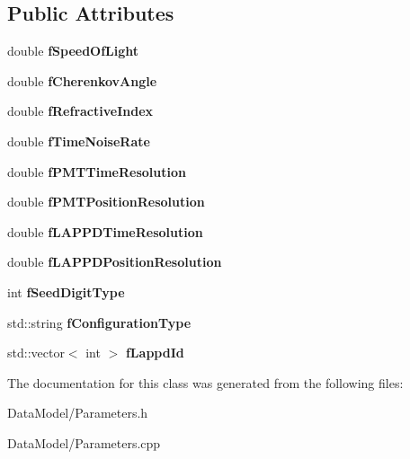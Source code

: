 \subsection*{Public Attributes}
\begin{DoxyCompactItemize}
\item 
\hypertarget{classParameters_a0ab2806085b853d149fd6e4c8e569cca}{double {\bfseries f\-Speed\-Of\-Light}}\label{classParameters_a0ab2806085b853d149fd6e4c8e569cca}

\item 
\hypertarget{classParameters_ab8ef3df2fb41ab745ff7647dbc8cc50b}{double {\bfseries f\-Cherenkov\-Angle}}\label{classParameters_ab8ef3df2fb41ab745ff7647dbc8cc50b}

\item 
\hypertarget{classParameters_a71d8363c51b45b3eea2845316a8a4f5d}{double {\bfseries f\-Refractive\-Index}}\label{classParameters_a71d8363c51b45b3eea2845316a8a4f5d}

\item 
\hypertarget{classParameters_ad90255179abb7853ac6d16e5905aa6c6}{double {\bfseries f\-Time\-Noise\-Rate}}\label{classParameters_ad90255179abb7853ac6d16e5905aa6c6}

\item 
\hypertarget{classParameters_ace595d49d4d72a00af0becfcb7c92dad}{double {\bfseries f\-P\-M\-T\-Time\-Resolution}}\label{classParameters_ace595d49d4d72a00af0becfcb7c92dad}

\item 
\hypertarget{classParameters_a94b1d9e403f02af9ba58763803eef51e}{double {\bfseries f\-P\-M\-T\-Position\-Resolution}}\label{classParameters_a94b1d9e403f02af9ba58763803eef51e}

\item 
\hypertarget{classParameters_a92dbf523ca3a928c72e18cff5e93f4cb}{double {\bfseries f\-L\-A\-P\-P\-D\-Time\-Resolution}}\label{classParameters_a92dbf523ca3a928c72e18cff5e93f4cb}

\item 
\hypertarget{classParameters_a32904c328c259d8eb7760799d2209cee}{double {\bfseries f\-L\-A\-P\-P\-D\-Position\-Resolution}}\label{classParameters_a32904c328c259d8eb7760799d2209cee}

\item 
\hypertarget{classParameters_a681104d5b6cc6f589095f5759b7e0480}{int {\bfseries f\-Seed\-Digit\-Type}}\label{classParameters_a681104d5b6cc6f589095f5759b7e0480}

\item 
\hypertarget{classParameters_aed4dffbeb510be19702f836a75cecc7f}{std\-::string {\bfseries f\-Configuration\-Type}}\label{classParameters_aed4dffbeb510be19702f836a75cecc7f}

\item 
\hypertarget{classParameters_a2e0a3f1bbb8ffa7e40f84d09452f1f41}{std\-::vector$<$ int $>$ {\bfseries f\-Lappd\-Id}}\label{classParameters_a2e0a3f1bbb8ffa7e40f84d09452f1f41}

\end{DoxyCompactItemize}


The documentation for this class was generated from the following files\-:\begin{DoxyCompactItemize}
\item 
Data\-Model/Parameters.\-h\item 
Data\-Model/Parameters.\-cpp\end{DoxyCompactItemize}
